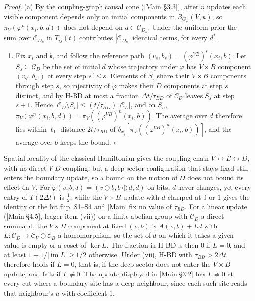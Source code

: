 \documentclass[
]{article}
\providecommand{\tightlist}{%
  \setlength{\itemsep}{0pt}\setlength{\parskip}{0pt}}
\begin{document}
\emph{Proof.} (a) By the coupling-graph causal cone ({[}Main §3.3{]}),
after \(n\) updates each visible component depends only on initial
components in \(B_{G_\varphi}(V, n)\), so
\(\pi_V(\varphi^n(x_i, b, d))\) does not depend on
\(d \in \mathcal{C}_{D_n}\). Under the uniform prior the sum over
\(\mathcal{C}_{D_n}\) in \(T_{ij}(t)\) contributes
\(|\mathcal{C}_{D_n}|\) identical terms, for every \(d^*\).

\begin{enumerate}
\def\labelenumi{(\alph{enumi})}
\setcounter{enumi}{1}
\tightlist
\item
  Fix \(x_i\) and \(b\), and follow the reference path
  \((v_s, b_s) = (\varphi^{VB})^s(x_i, b)\). Let
  \(S_s \subseteq \mathcal{C}_D\) be the set of initial \(d\) whose
  trajectory under \(\varphi\) has \(V \times B\) component
  \((v_{s'}, b_{s'})\) at every step \(s' \leq s\). Elements of \(S_s\)
  share their \(V \times B\) components through step \(s\), so
  injectivity of \(\varphi\) makes their \(D\) components at step \(s\)
  distinct, and by H-BD at most a fraction \(\Delta t/\tau_{BD}\) of
  \(\mathcal{C}_D\) leaves \(S_s\) at step \(s+1\). Hence
  \(|\mathcal{C}_D \setminus S_n| \leq (t/\tau_{BD})\,|\mathcal{C}_D|\),
  and on \(S_n\),
  \(\pi_V(\varphi^n(x_i, b, d)) = \pi_V((\varphi^{VB})^n(x_i, b))\). The
  average over \(d\) therefore lies within \(\ell_1\) distance
  \(2t/\tau_{BD}\) of \(\delta_{x_j}[\pi_V((\varphi^{VB})^n(x_i, b))]\),
  and the average over \(b\) keeps the bound. \(\square\)
\end{enumerate}

Spatial locality of the classical Hamiltonian gives the coupling chain
\(V \leftrightarrow B \leftrightarrow D\), with no direct \(V\)-\(D\)
coupling, but a deep-sector configuration that stays fixed still enters
the boundary update, so a bound on the motion of \(D\) does not bound
its effect on \(V\). For
\(\varphi(v, b, d) = (v \oplus b, b \oplus d, d)\) on bits, \(d\) never
changes, yet every entry of \(T(2\Delta t)\) is \(\tfrac12\), while the
\(V \times B\) update with \(d\) clamped at \(0\) or \(1\) gives the
identity or the bit flip. S1--S4 and {[}Main{]} fix no value of
\(\tau_{BD}\). For a linear update ({[}Main §4.5{]}, ledger item (vii))
on a finite abelian group with \(\mathcal{C}_D\) a direct summand, the
\(V \times B\) component at fixed \((v, b)\) is \(A(v, b) + Ld\) with
\(L: \mathcal{C}_D \to \mathcal{C}_V \oplus \mathcal{C}_B\) a
homomorphism, so the set of \(d\) on which it takes a given value is
empty or a coset of \(\ker L\). The fraction in H-BD is then \(0\) if
\(L = 0\), and at least \(1 - 1/|\operatorname{im} L| \geq 1/2\)
otherwise. Under (vii), H-BD with \(\tau_{BD} > 2\Delta t\) therefore
holds if \(L = 0\), that is, if the deep sector does not enter the
\(V \times B\) update, and fails if \(L \neq 0\). The update displayed
in {[}Main §3.2{]} has \(L \neq 0\) at every cut where a boundary site
has a deep neighbour, since each such site reads that neighbour's \(u\)
with coefficient \(1\).
\end{document}

